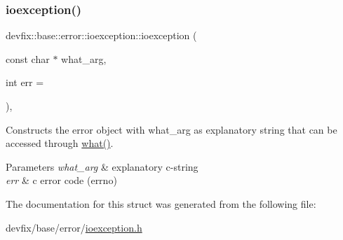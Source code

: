 \subsubsection{\texorpdfstring{ioexception()}{ioexception()}\hspace{0.1cm}{\footnotesize\ttfamily [2/2]}}
{\footnotesize\ttfamily devfix\+::base\+::error\+::ioexception\+::ioexception (\begin{DoxyParamCaption}\item[{const char $\ast$}]{what\+\_\+arg,  }\item[{int}]{err = {} }\end{DoxyParamCaption})\hspace{0.3cm}{\ttfamily [inline]}, {\ttfamily [explicit]}}

Constructs the error object with what\+\_\+arg as explanatory string that can be accessed through \hyperlink{structdevfix_1_1base_1_1error_1_1baseexception_a16327152a55d65b1e537825231fbd452}{what()}. 
\begin{DoxyParams}{Parameters}
{\em what\+\_\+arg} & explanatory c-\/string \\
\hline
{\em err} & c error code (errno) \\
\hline
\end{DoxyParams}


The documentation for this struct was generated from the following file\+:\begin{DoxyCompactItemize}
\item 
devfix/base/error/\hyperlink{ioexception_8h}{ioexception.\+h}\end{DoxyCompactItemize}
